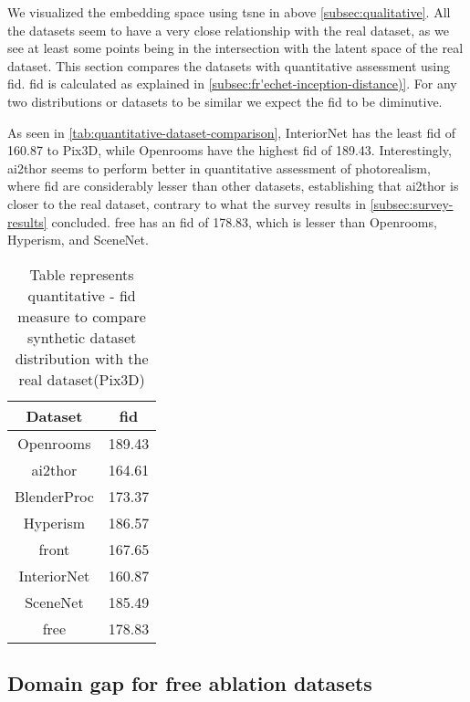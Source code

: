We visualized the embedding space using \gls{tsne} in above \autoref{subsec:qualitative}.
All the datasets seem to have a very close relationship with the real dataset, as we see at least some points being in the intersection with the latent space of the real dataset.
This section compares the datasets with quantitative assessment using \gls{fid}.
\gls{fid} is calculated as explained in \autoref{subsec:fr'echet-inception-distance)}.
For any two distributions or datasets to be similar we expect the \gls{fid} to be diminutive.

As seen in \autoref{tab:quantitative-dataset-comparison}, InteriorNet has the least \gls{fid} of 160.87 to Pix3D, while Openrooms have the highest \gls{fid} of 189.43.
Interestingly, \gls{ai2thor} seems to perform better in quantitative assessment of photorealism,
where \gls{fid} are considerably lesser than other datasets,
establishing that \gls{ai2thor} is closer to the real dataset, contrary to what the survey results in \autoref{subsec:survey-results} concluded.
\gls{free} has an \gls{fid} of 178.83, which is lesser than Openrooms, Hyperism, and SceneNet.

\begin{table}[ht]
    \centering
    \begin{tabular}{|c |c |}
        \hline
        Dataset & \gls{fid} \\ [0.5ex]
        \hline\hline
        Openrooms & 189.43 \\
        \hline
        \gls{ai2thor} & 164.61 \\
        \hline
        BlenderProc  & 173.37 \\
        \hline
        Hyperism  & 186.57 \\
        \hline
        \gls{front}  & 167.65 \\
        \hline
        InteriorNet  & 160.87 \\
        \hline
        SceneNet & 185.49 \\
        \hline
        \gls{free} & 178.83 \\[1ex]
        \hline
    \end{tabular}
    \caption{Table represents quantitative - \gls{fid} measure to compare synthetic dataset distribution with the real dataset(Pix3D)}
    \label{tab:quantitative-dataset-comparison}
\end{table}

\subsection{Domain gap for \gls{free} ablation datasets}

